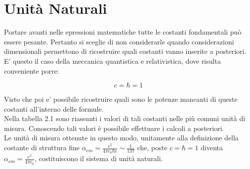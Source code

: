 
\chapter{Unità Naturali}

Portare avanti nelle epressioni matematiche tutte le costanti fondamentali può essere pesante. Pertanto si sceglie di non considerarle quando considerazioni dimensionali permettono di ricostruire quali costanti vanno inserite a posteriori. E' questo il caso della meccanica quantistica e relativistica, dove risulta conveniente porre:

\begin{equation}
c=\hbar=1
\end{equation}

Visto che poi e' possibile ricostruire quali sono le potenze mancanti di queste costanti all'interno delle formule.\\

Nella tabella 2.1 sono riassunti i valori di tali costanti nelle più comuni unità di misura. Conoscendo tali valori è possibile effettuare i calcoli a posteriori.\\
Le unità di misura ottenute in questo modo, unitamente alla definizione della costante di struttura fine $\alpha_{em}=\frac{e^2}{4\pi\epsilon_0\hbar c}\sim\frac{1}{137}$ che, poste $c=\hbar=1$ diventa $\alpha_{em}=\frac{e^2}{4\pi\epsilon_0}$, costituiscono il sistema di unità naturali.

